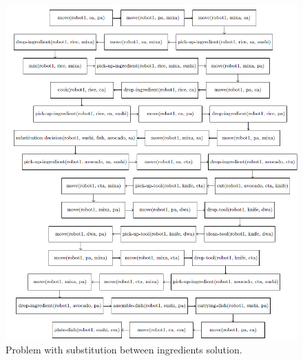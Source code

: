   \begin{figure}[t]
    \centering
    \includegraphics[width=1\linewidth]{fig2.png}
    \caption{Problem with substitution between ingredients solution.}
    \label{fig:fig2}
  \end{figure}